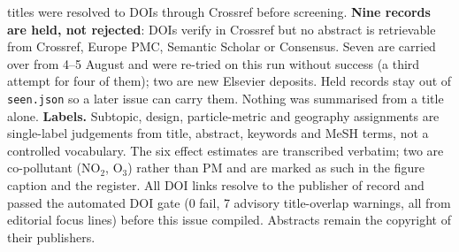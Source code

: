 \documentclass[10pt]{article}
\begin{document}
\begin{keybox}
{titles were resolved to DOIs through Crossref before screening. \textbf{Nine records are
held, not rejected}: DOIs verify in Crossref but no abstract is retrievable from Crossref,
Europe PMC, Semantic Scholar or Consensus. Seven are carried over from 4--5 August and
were re-tried on this run without success (a third attempt for four of them); two are new
Elsevier deposits. Held records stay out of \texttt{seen.json} so a later issue can carry
them. Nothing was summarised from a title alone.
\textbf{Labels.} Subtopic, design, particle-metric and geography assignments are
single-label judgements from title, abstract, keywords and MeSH terms, not a controlled
vocabulary. The six effect estimates are transcribed verbatim; two are co-pollutant
(NO$_2$, O$_3$) rather than PM and are marked as such in the figure caption and the
register.
All DOI links resolve to the publisher of record and passed the automated DOI gate
(0 fail, 7 advisory title-overlap warnings, all from editorial focus lines) before this
issue compiled. Abstracts remain the copyright of their publishers.\par}
\end{keybox}
\end{document}
